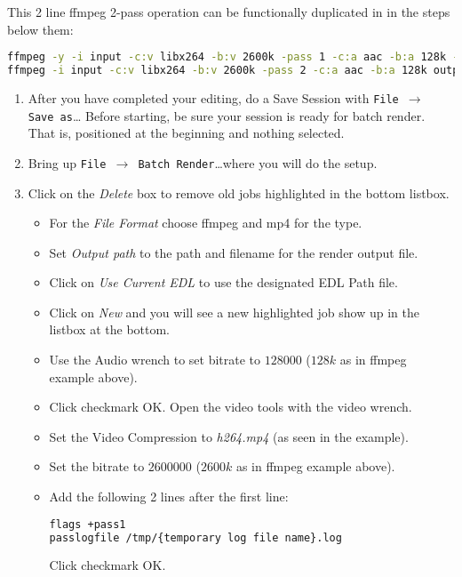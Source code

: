 This 2 line ffmpeg 2-pass operation can be functionally duplicated in \CGG{} in the steps below them:

\begin{lstlisting}[language=bash,numbers=none]
ffmpeg -y -i input -c:v libx264 -b:v 2600k -pass 1 -c:a aac -b:a 128k -f mp4 /dev/null && \
ffmpeg -i input -c:v libx264 -b:v 2600k -pass 2 -c:a aac -b:a 128k output.mp4
\end{lstlisting}

\begin{enumerate}
    \item After you have completed your editing, do a Save Session with \texttt{File $\rightarrow$ Save as}\dots
    Before starting, be sure your session is ready for batch render. That is, positioned at the beginning and nothing selected.
    \item Bring up \texttt{File $\rightarrow$ Batch Render}\dots where you will do the setup.
    \item Click on the \textit{Delete} box  to remove old jobs highlighted in the bottom listbox.
    \begin{itemize}
        \item For the \textit{File Format} choose ffmpeg and mp4 for the type.
        \item Set \textit{Output path} to the path and filename for the render output file.
        \item Click on \textit{Use Current EDL} to use the designated EDL Path file.
        \item Click on \textit{New} and you will see a new highlighted job show up in the listbox at the bottom.
        \item Use the Audio wrench to set bitrate to $128000$ ($128k$ as in ffmpeg example above).
        \item Click checkmark OK.  Open the video tools with the video wrench.
        \item Set the Video Compression to \textit{h264.mp4} (as seen in the example).
        \item Set the bitrate to $2600000$ ($2600k$ as in ffmpeg example above).
        \item Add the following 2 lines after the first line:
        \begin{lstlisting}[language=bash,numbers=none]
flags +pass1
passlogfile /tmp/{temporary log file name}.log
        \end{lstlisting}
        Click checkmark OK.
    \end{itemize}    

\end{enumerate}
